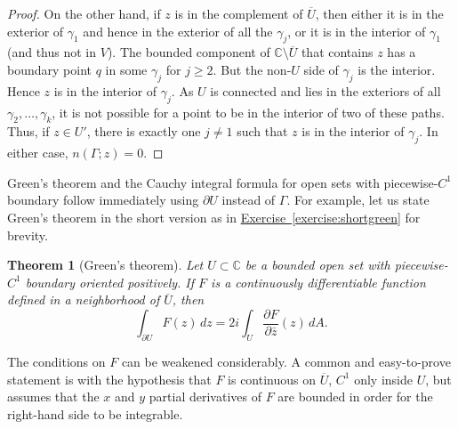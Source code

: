 \documentclass[12pt,openany]{book}
\newcommand{\widebar}[1]{\overline{#1}}
\newcommand{\C}{{\mathbb{C}}}
\theoremstyle{plain}
\newtheorem{thm}{Theorem}[section]
\theoremstyle{remark}
\theoremstyle{definition}
\theoremstyle{exercise}
\theoremstyle{example}
\newcommand{\exerciseref}[1]{\hyperref[#1]{Exercise~\ref*{#1}}}
\begin{document}
\begin{proof}
On the other hand, if $z$ is in the complement of $\widebar{U}$, then either it
is in the exterior of $\gamma_1$ and hence in the exterior of all the
$\gamma_j$, or it is in the interior of $\gamma_1$ (and thus not in $V$).
The bounded component of $\C \setminus \widebar{U}$ that contains $z$
has a boundary point $q$ in some $\gamma_j$ for $j \geq 2$.
But the non-$U$ side of $\gamma_j$ is the interior.  Hence $z$ is
in the interior of $\gamma_j$.
As $U$ is connected and lies in the exteriors
of all $\gamma_2,\ldots,\gamma_k$, it is not possible for a point to be in
the interior of two of these paths.  Thus, if $z \in U'$, there is exactly
one $j \neq 1$
such that $z$ is in the interior of $\gamma_j$.  In either case,
$n(\Gamma;z) = 0$.
\end{proof}

Green's theorem and the Cauchy integral formula for open sets with
piecewise-$C^1$ boundary follow immediately
using $\partial U$ instead of $\Gamma$.
For example, let us state Green's theorem in the short version 
as in \exerciseref{exercise:shortgreen} for brevity.

\begin{thm}[Green's theorem] \label{thm:greens2}
\pagebreak[2]
Let $U \subset \C$ be a bounded open set with
piecewise-$C^1$ boundary oriented positively.
If $F$ is a continuously differentiable function defined in a neighborhood
of $\widebar{U}$, then
\begin{equation*}
\int_{\partial U} F(z) \, dz
=
2i
\int_{U}
\frac{\partial F}{\partial \bar{z}}(z)
\, dA .
\end{equation*}
\end{thm}

The conditions on $F$ can be weakened considerably.
A common and easy-to-prove statement is with the hypothesis that $F$ is continuous on
$\widebar{U}$, $C^1$ only
inside $U$, but assumes that the $x$ and $y$ partial derivatives of $F$ are bounded in order for the
right-hand side to be integrable.
\end{document}
